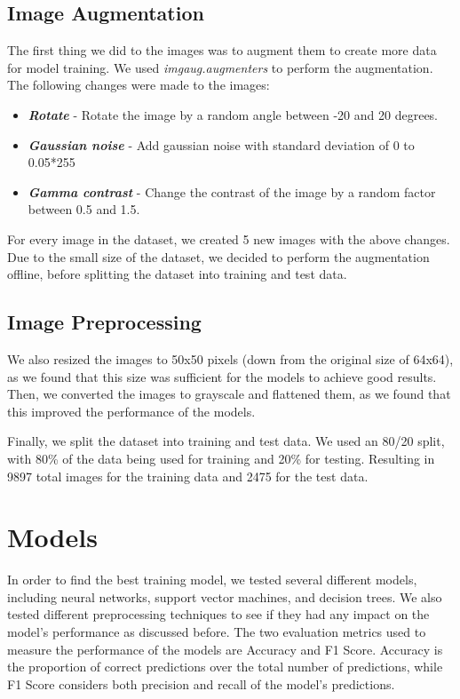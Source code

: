 \documentclass[conference]{IEEEtran}
\begin{document}
\subsection{Image Augmentation}
The first thing we did to the images was to augment them to create more data for model training. 
We used \textit{imgaug.augmenters} to perform the augmentation. 
The following changes were made to the images:
\begin{itemize}
    \item \textit{\textbf{Rotate}} - Rotate the image by a random angle between -20 and 20 degrees.
    \item \textit{\textbf{Gaussian noise}} - Add gaussian noise with standard deviation of 0 to 0.05*255
    \item \textit{\textbf{Gamma contrast}} - Change the contrast of the image by a random factor between 0.5 and 1.5.
\end{itemize}
For every image in the dataset, we created 5 new images with the above changes. Due to the small size of the dataset, we decided to perform the augmentation offline, before splitting the dataset into training and test data.

\subsection{Image Preprocessing}
We also resized the images to 50x50 pixels (down from the original size of 64x64), as we found that this size was sufficient for the models to achieve good results. Then, we converted the images to grayscale and flattened them, as we found that this improved the performance of the models.

Finally, we split the dataset into training and test data. We used an 80/20 split, with 80\% of the data being used for training and 20\% for testing.
Resulting in 9897 total images for the training data and 2475 for the test data.
\section{Models}
In order to find the best training model, we tested several different models, including neural networks, support vector machines, and decision trees. We also tested different preprocessing techniques to see if they had any impact on the model's performance as discussed before.
The two evaluation metrics used to measure the performance of the models are Accuracy and F1 Score. Accuracy is the proportion of correct predictions over the total number of predictions, while F1 Score considers both precision and recall of the model's predictions.
\end{document}
